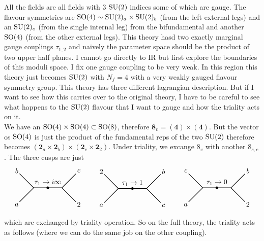All the fields are all fields with $3$ $\mathrm{SU}(2)$ indices some of which are gauge. The flavour symmetries are $\mathrm{SO}(4)\sim\mathrm{SU}(2)_{a}\times\mathrm{SU}(2)_{b}$ (from the left external legs) and an $\mathrm{SU}(2)_{c}$ (from the single internal leg) from the bifundamental and another $\mathrm{SO}(4)$ (from the other external legs). This theory hasd two exactly marginal gauge couplings $\tau_{1,2}$ and naively the parameter space should be the product of two upper half planes. I cannot go directly to IR but first explore the boundaries of this moduli space. I fix one gauge coupling to be very weak. In this region this theory just becomes $\mathrm{SU}(2)$ with $N_{f}=4$ with a very weakly gauged flavour symmetry group. This theory has three different lagrangian description. But if I want to see how this carries over to the original theory, I have to be careful to see what happens to the $\mathrm{SU}(2)$ flavour that I want to gauge and how the triality acts on it.\\
We have an $\mathrm{SO}(4)\times\mathrm{SO}(4)\subset\mathrm{SO}(8)$, therefore $\mathbf{8}_{v}=(\mathbf{4})\times(\mathbf{4})$. But the vector os $\mathrm{SO}(4)$ is just the product of the fundamental reps of the two $\mathrm{SU}(2)$ therefore becomes $(\mathbf{2}_{a}\times \mathbf{2}_{b})\times(\mathbf{2}_{c}\times \mathbf{2}_{2})$. Under triality, we excange $8_{v}$ with another $8_{s,c}$. The three cusps are just
\begin{equation}
\begin{tikzpicture}[thick,scale=0.7]
  \node at (-.2,.2) {$b$};
  \node at (-.2,-2.2) {$a$};
  \node at (4.2,.2) {$c$};
  \node at (4.2,-2.2) {$2$};
  \draw[-](0,0)--(1,-1);
  \draw[-](1,-1)--(0,-2);
  \draw[-](1,-1)--(2,-1);
  \draw[-](2,-1)--(3,-1);
  \draw[-](3,-1)--(4,0);
  \draw[-](3,-1)--(4,-2);
  \filldraw[black] (2,-1) circle (2pt) node[above]{$\tau_{1}\rightarrow i \infty$};
\end{tikzpicture}\qquad\begin{tikzpicture}[thick,scale=0.7]
  \node at (-.2,.2) {$2$};
  \node at (-.2,-2.2) {$a$};
  \node at (4.2,.2) {$b$};
  \node at (4.2,-2.2) {$c$};
  \draw[-](0,0)--(1,-1);
  \draw[-](1,-1)--(0,-2);
  \draw[-](1,-1)--(2,-1);
  \draw[-](2,-1)--(3,-1);
  \draw[-](3,-1)--(4,0);
  \draw[-](3,-1)--(4,-2);
  \filldraw[black] (2,-1) circle (2pt) node[above]{$\tau_{1}\rightarrow 1$};
\end{tikzpicture}\qquad\begin{tikzpicture}[thick,scale=0.7]
  \node at (-.2,.2) {$c$};
  \node at (-.2,-2.2) {$a$};
  \node at (4.2,.2) {$b$};
  \node at (4.2,-2.2) {$2$};
  \draw[-](0,0)--(1,-1);
  \draw[-](1,-1)--(0,-2);
  \draw[-](1,-1)--(2,-1);
  \draw[-](2,-1)--(3,-1);
  \draw[-](3,-1)--(4,0);
  \draw[-](3,-1)--(4,-2);
  \filldraw[black] (2,-1) circle (2pt) node[above]{$\tau_{1}\rightarrow 0$};
\end{tikzpicture}
\end{equation}
which are exchanged by triality operation. So on the full theory, the triality acts as follows (where we can do the same job on the other coupling).

